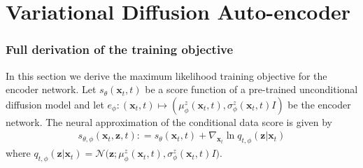 
\chapter{Variational Diffusion Auto-encoder}

\subsection{Full derivation of the training objective}
\label{ch4:sec:mle_objective}
In this section we derive the maximum likelihood training objective for the encoder network.
Let $s_\theta(\textbf{x}_t, t)$ be a score function of a pre-trained unconditional diffusion model and let $e_\phi: (\textbf{x}_t, t) \mapsto (\mu_\phi^z(\textbf{x}_t, t), \sigma^z_\phi(\textbf{x}_t, t)I)$ be the encoder network.
The neural approximation of the conditional data score is given by
\begin{gather*}
s_{\theta, \phi}(\textbf{x}_t, \textbf{z}, t) : = s_\theta(\textbf{x}_t, t) + \nabla_{\textbf{x}_t} \ln q_{t, \phi}(\textbf{z} | \textbf{x}_t)    
\end{gather*}
where $q_{t, \phi}(\textbf{z} | \textbf{x}_t) = \mathcal{N}\big( \textbf{z} ; \mu_\phi^z(\textbf{x}_t, t), \sigma^z_\phi(\textbf{x}_t, t)I \big)$.


